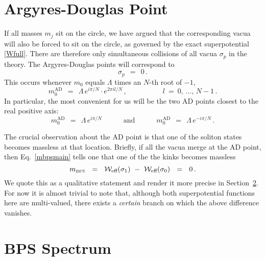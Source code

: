\documentclass[epsfig,12pt]{article}
\def\beq{\begin{equation}}
\def\eeq{\end{equation}}
\def\beq{\begin{equation}}
\def\eeq{\end{equation}}
\newcommand{\mbps}{m_{\text{\tiny BPS}}}
\newcommand{\W}{\mathcal{W}}
\begin{document}
\section{Argyres-Douglas Point}

	If all masses $ m_j $ sit on the circle, we have argued that the corresponding
	vacua will also be forced to sit on the circle, as governed by the exact superpotential
	\eqref{Wfull}.
	There are therefore only simultaneous collisions of all vacua $ \sigma_p $
	in the theory.
	The Argyres-Douglas points \cite{AD} will correspond to 
\beq
	\sigma_p ~~=~~ 0\,.
\eeq
	This occurs whenever $ m_0 $ equals $ \Lambda $ times an $N$-th root of $ -1 $,
\beq
	m_0^\text{AD} ~~=~~ \Lambda \, e^{i \pi / N} \cdot e^{2\pi i l / N}\,,
	\qquad\qquad\quad 
	l ~=~ 0,\,...,\, N-1 \,.
\eeq
	In particular, the most convenient for us will be the two AD points closest to the
	real positive axis:
\beq
	m_0^\text{AD} ~~=~~ \Lambda \, e^{i \pi / N}
	\qquad\quad
	\text{and}
	\qquad\quad
	m_0^\text{AD} ~~=~~ \Lambda \, e^{- i \pi / N}\,.
\eeq

	The crucial observation about the AD point is that one of the soliton states becomes massless
	at that location.
	Briefly, if all the vacua merge at the AD point, then Eq.~\eqref{mbpsmain} tells one 
	that one of the the kinks becomes massless 
\beq
	\mbps ~~=~~ \W_\text{eff}(\sigma_1) ~-~ \W_\text{eff}(\sigma_0) ~~=~~ 0\,.
\eeq
	We quote this as a qualitative statement and render it more precise in Section~\ref{sbps}.
	For now it is almost trivial to note that, although both superpotential functions here are multi-valued, 
	there exists a {\it certain} branch on which the above difference vanishes.
	

\section{BPS Spectrum}
\label{sbps}
\end{document}
